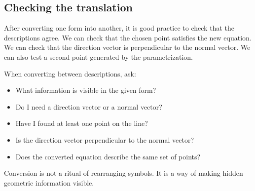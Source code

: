 \subsection*{Checking the translation}

After converting one form into another, it is good practice to check that the descriptions agree. We can check that the chosen point satisfies the new equation. We can check that the direction vector is perpendicular to the normal vector. We can also test a second point generated by the parametrization.

\begin{summarybox}
When converting between descriptions, ask:
\begin{itemize}
\item What information is visible in the given form?
\item Do I need a direction vector or a normal vector?
\item Have I found at least one point on the line?
\item Is the direction vector perpendicular to the normal vector?
\item Does the converted equation describe the same set of points?
\end{itemize}
\end{summarybox}

Conversion is not a ritual of rearranging symbols. It is a way of making hidden geometric information visible.